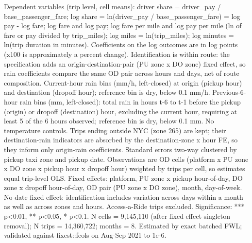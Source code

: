 \par \raggedright 
Dependent variables (trip level, cell means): driver share = driver\_pay / base\_passenger\_fare; log share = ln(driver\_pay / base\_passenger\_fare) = log pay - log fare; log fare and log pay; log fare per mile and log pay per mile (ln of fare or pay divided by trip\_miles); log miles = ln(trip\_miles); log minutes = ln(trip duration in minutes). Coefficients on the log outcomes are in log points (x100 is approximately a percent change). Identification is within route: the specification adds an origin-destination-pair (PU zone x DO zone) fixed effect, so rain coefficients compare the same OD pair across hours and days, net of route composition. Current-hour rain bins (mm/h, left-closed) at origin (pickup hour) and destination (dropoff hour); reference bin is dry, below 0.1 mm/h. Previous-6-hour rain bins (mm, left-closed): total rain in hours t-6 to t-1 before the pickup (origin) or dropoff (destination) hour, excluding the current hour, requiring at least 5 of the 6 hours observed; reference bin is dry, below 0.1 mm. No temperature controls. Trips ending outside NYC (zone 265) are kept; their destination-rain indicators are absorbed by the destination-zone x hour FE, so they inform only origin-rain coefficients. Standard errors two-way clustered by pickup taxi zone and pickup date. Observations are OD cells (platform x PU zone x DO zone x pickup hour x dropoff hour) weighted by trips per cell, so estimates equal trip-level OLS. Fixed effects: platform, PU zone x pickup hour-of-day, DO zone x dropoff hour-of-day, OD pair (PU zone x DO zone), month, day-of-week. No date fixed effect: identification includes variation across days within a month as well as across zones and hours. Access-a-Ride trips excluded. Significance: *** p<0.01, ** p<0.05, * p<0.1. N cells = 9,145,110 (after fixed-effect singleton removal); N trips = 14,360,722; months = 8. Estimated by exact batched FWL; validated against fixest::feols on Aug-Sep 2021 to 1e-6.
\par\endgroup
\ifdefined\ifclassloaded
{}
\fi
